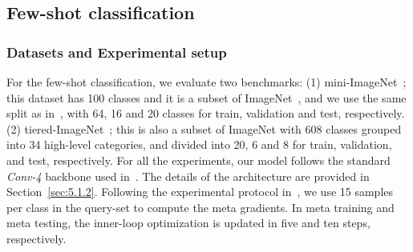 \begin{table}[t!]
    \caption{Few-shot regression for the sinusoid regression benchmark with a \textit{2-layer MLP} backbone. We report MSE  95\% confidence intervals(ci) for 600 tasks following the setup in \cite{finn2017model}.  denotes PGD-MAML family.}
  \centering
  \label{tab:regression}
\end{table}

\subsection{Few-shot classification}
\subsubsection{Datasets and Experimental setup}
For the few-shot classification, we evaluate two benchmarks:
(1) mini-ImageNet~\cite{vinyals2016matching}; this dataset has 100 classes and it is a subset of ImageNet~\cite{russakovsky2015imagenet}, and we use the same split as in~\cite{ravi2016optimization}, with 64, 16 and 20 classes for train, validation and test, respectively. (2) tiered-ImageNet~\cite{ren2018meta}; this is also a subset of ImageNet with 608 classes grouped into 34 high-level categories, and divided into 20, 6 and 8 for train, validation, and test, respectively.
For all the experiments, our model follows the standard \textit{Conv-4} backbone used in~\cite{vinyals2016matching}.
The details of the architecture are provided in Section~\ref{sec:5.1.2}.
Following the experimental protocol in~\cite{finn2017model}, we use 15 samples per class in the query-set to compute the meta gradients. In meta training and meta testing, the inner-loop optimization is updated in five and ten steps, respectively.


